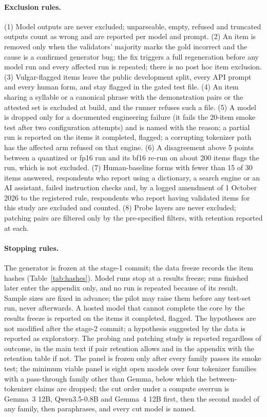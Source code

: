 \paragraph{Exclusion rules.}
(1) Model outputs are never excluded; unparseable, empty, refused and truncated outputs count as wrong and are reported per model and prompt. (2) An item is removed only when the validators' majority marks the gold incorrect and the cause is a confirmed generator bug; the fix triggers a full regeneration before any model run and every affected run is repeated; there is no post hoc item exclusion. (3) Vulgar-flagged items leave the public development split, every API prompt and every human form, and stay flagged in the gated test file. (4) An item sharing a syllable or a canonical phrase with the demonstration pairs or the attested set is excluded at build, and the runner refuses such a file. (5) A model is dropped only for a documented engineering failure (it fails the 20-item smoke test after two configuration attempts) and is named with the reason; a partial run is reported on the items it completed, flagged; a corrupting tokenizer path has the affected arm refused on that engine. (6) A disagreement above 5 points between a quantized or fp16 run and its bf16 re-run on about 200 items flags the run, which is not excluded. (7) Human-baseline forms with fewer than 15 of 30 items answered, respondents who report using a dictionary, a search engine or an AI assistant, failed instruction checks and, by a logged amendment of 1 October 2026 to the registered rule, respondents who report having validated items for this study are excluded and counted. (8) Probe layers are never excluded; patching pairs are filtered only by the pre-specified filters, with retention reported at each.

\paragraph{Stopping rules.}
The generator is frozen at the stage-1 commit; the data freeze records the item hashes (Table~\ref{tab:hashes}). Model runs stop at a results freeze; runs finished later enter the appendix only, and no run is repeated because of its result. Sample sizes are fixed in advance; the pilot may raise them before any test-set run, never afterwards. A hosted model that cannot complete the core by the results freeze is reported on the items it completed, flagged. The hypotheses are not modified after the stage-2 commit; a hypothesis suggested by the data is reported as exploratory. The probing and patching study is reported regardless of outcome, in the main text if pair retention allows and in the appendix with the retention table if not. The panel is frozen only after every family passes its smoke test; the minimum viable panel is eight open models over four tokenizer families with a pass-through family other than Gemma, below which the between-tokenizer claims are dropped; the cut order under a compute overrun is Gemma~3 12B, Qwen3.5-0.8B and Gemma~4 12B first, then the second model of any family, then paraphrases, and every cut model is named.


